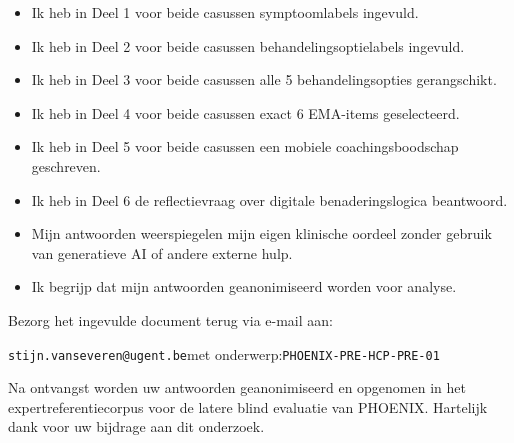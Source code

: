 \documentclass[11pt,a4paper]{article}
\begin{document}
\begin{instrbox}[title=Checklist voor terugbezorging]
\begin{itemize}
\item[$\square$] Ik heb in Deel 1 voor beide casussen symptoomlabels ingevuld.
\item[$\square$] Ik heb in Deel 2 voor beide casussen behandelingsoptielabels ingevuld.
\item[$\square$] Ik heb in Deel 3 voor beide casussen alle 5 behandelingsopties gerangschikt.
\item[$\square$] Ik heb in Deel 4 voor beide casussen exact 6 EMA-items geselecteerd.
\item[$\square$] Ik heb in Deel 5 voor beide casussen een mobiele coachingsboodschap geschreven.
\item[$\square$] Ik heb in Deel 6 de reflectievraag over digitale benaderingslogica beantwoord.
\item[$\square$] Mijn antwoorden weerspiegelen mijn eigen klinische oordeel zonder gebruik van generatieve AI of andere externe hulp.
\item[$\square$] Ik begrijp dat mijn antwoorden geanonimiseerd worden voor analyse.
\end{itemize}
\end{instrbox}

\medskip
Bezorg het ingevulde document terug via e-mail aan:
\begin{center}
\texttt{stijn.vanseveren@ugent.be}\quad met onderwerp:\quad \texttt{PHOENIX-PRE-HCP-PRE-01}
\end{center}

\vspace{0.5em}
\begin{tcolorbox}[colback=AccentBlue,colframe=PrimaryBlue,arc=2mm,boxrule=0.6pt,left=8pt,right=8pt,top=7pt,bottom=7pt]
\small\centering
Na ontvangst worden uw antwoorden geanonimiseerd en opgenomen in het expertreferentiecorpus
voor de latere blind evaluatie van PHOENIX. Hartelijk dank voor uw bijdrage aan dit onderzoek.
\end{tcolorbox}
\end{document}
